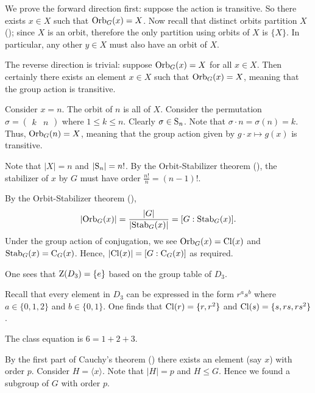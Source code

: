\begin{questions}
    \item We prove the forward direction first: suppose the action is transitive. So there exists $x \in X$ such that $\mathrm{Orb}_{G}(x) = X$. Now recall that distinct orbits partition $X$ (); since $X$ is an orbit, therefore the only partition using orbits of $X$ is $\{X\}$. In particular, any other $y \in X$ must also have an orbit of $X$.

    The reverse direction is trivial: suppose $\mathrm{Orb}_{G}(x) = X$ for all $x \in X$. Then certainly there exists an element $x \in X$ such that $\mathrm{Orb}_{G}(x) = X$, meaning that the group action is transitive.

    \item \begin{partquestions}{\alph*}
        \item Consider $x = n$. The orbit of $n$ is all of $X$. Consider the permutation $\sigma = \begin{pmatrix}k & n\end{pmatrix}$ where $1 \leq k \leq n$. Clearly $\sigma \in \mathrm{S}_{n}$. Note that $\sigma \cdot n = \sigma(n) = k$. Thus, $\mathrm{Orb}_{G}(n) = X$, meaning that the group action given by $g \cdot x \mapsto g(x)$ is transitive.

        \item Note that $|X| = n$ and $|\mathrm{S}_{n}| = n!$. By the Orbit-Stabilizer theorem (), the stabilizer of $x$ by $G$ must have order $\frac{n!}{n} = (n-1)!$.
    \end{partquestions}

    \item By the Orbit-Stabilizer theorem (),
    \[
        |\mathrm{Orb}_{G}(x)| = \frac{|G|}{|\mathrm{Stab}_{G}(x)|} = [G : \mathrm{Stab}_{G}(x)].
    \]
    Under the group action of conjugation, we see $\mathrm{Orb}_{G}(x) = \mathrm{Cl}(x)$ and $\mathrm{Stab}_{G}(x) = \mathrm{C}_{G}(x)$. Hence, $|\mathrm{Cl}(x)| = [G : \mathrm{C}_{G}(x)]$ as required.

    \item \begin{partquestions}{\alph*}
        \item One sees that $\mathrm{Z}(D_3) = \{e\}$ based on the group table of $D_3$.
        \item Recall that every element in $D_3$ can be expressed in the form $r^as^b$ where $a \in \{0, 1, 2\}$ and $b \in \{0, 1\}$. One finds that $\mathrm{Cl}(r) = \{r, r^2\}$ and $\mathrm{Cl}(s) = \{s, rs, rs^2\}$.
        \item The class equation is $6 = 1 + 2 + 3$.
    \end{partquestions}

    \item By the first part of Cauchy's theorem () there exists an element (say $x$) with order $p$. Consider $H = \langle x \rangle$. Note that $|H| = p$ and $H \leq G$. Hence we found a subgroup of $G$ with order $p$.
\end{questions}

